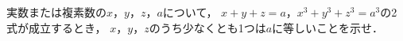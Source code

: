 \documentclass[../../main.tex]{subfiles}
\begin{document}
実数または複素数の$x$，$y$，$z$，$a$について，
$x+y+z=a$，$x^3+y^3+z^3=a^3$の2式が成立するとき，
$x$，$y$，$z$のうち少なくとも1つは$a$に等しいことを示せ．
\end{document}
